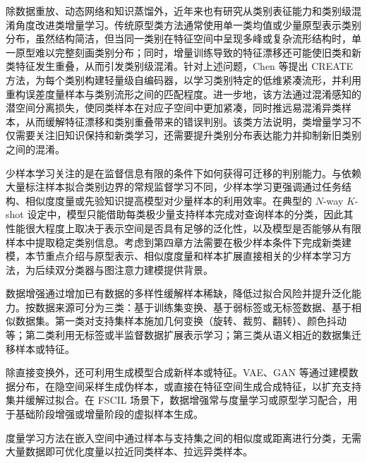 
除数据重放、动态网络和知识蒸馏外，近年来也有研究从类别表征能力和类别级混淆角度改进类增量学习。传统原型类方法通常使用单一类均值或少量原型表示类别分布，虽然结构简洁，但当同一类别在特征空间中呈现多峰或复杂流形结构时，单一原型难以完整刻画类别分布；同时，增量训练导致的特征漂移还可能使旧类和新类特征发生重叠，从而引发类别级混淆。针对上述问题，Chen 等提出 CREATE 方法\cite{chen2025create}，为每个类别构建轻量级自编码器，以学习类别特定的低维紧凑流形，并利用重构误差度量样本与类别流形之间的匹配程度。进一步地，该方法通过混淆感知的潜空间分离损失，使同类样本在对应子空间中更加紧凑，同时推远易混淆异类样本，从而缓解特征漂移和类别重叠带来的错误判别。该类方法说明，类增量学习不仅需要关注旧知识保持和新类学习，还需要提升类别分布表达能力并抑制新旧类别之间的混淆。


少样本学习关注的是在监督信息有限的条件下如何获得可迁移的判别能力。与依赖大量标注样本拟合类别边界的常规监督学习不同，少样本学习更强调通过任务结构、相似度度量或先验知识提高模型对少量样本的利用效率\cite{tian2024fscilsurvey,zhaokailin2021fslreview}。在典型的 $N$-way $K$-shot 设定中，模型只能借助每类极少量支持样本完成对查询样本的分类，因此其性能很大程度上取决于表示空间是否具有足够的泛化性，以及模型是否能够从有限样本中提取稳定类别信息\cite{tian2024fscilsurvey,zhaokailin2021fslreview}。考虑到第四章方法需要在极少样本条件下完成新类建模，本节重点介绍与原型表示、相似度度量和样本扩展直接相关的少样本学习方法，为后续双分类器与图注意力建模提供背景。


数据增强通过增加已有数据的多样性缓解样本稀缺，降低过拟合风险并提升泛化能力\cite{tian2024fscilsurvey}。按数据来源可分为三类：基于训练集变换、基于弱标签或无标签数据、基于相似数据集。第一类对支持集样本施加几何变换（旋转、裁剪、翻转）、颜色抖动等；第二类利用无标签或半监督数据扩展表示学习；第三类从语义相近的数据集迁移样本或特征。

除直接变换外，还可利用生成模型合成新样本或特征。VAE、GAN 等通过建模数据分布，在隐空间采样生成伪样本，或直接在特征空间生成合成特征，以扩充支持集并缓解过拟合\cite{tian2024fscilsurvey}。在 FSCIL 场景下，数据增强常与度量学习或原型学习配合，用于基础阶段增强或增量阶段的虚拟样本生成。


度量学习方法在嵌入空间中通过样本与支持集之间的相似度或距离进行分类，无需大量数据即可优化度量以拉近同类样本、拉远异类样本\cite{tian2024fscilsurvey}。

